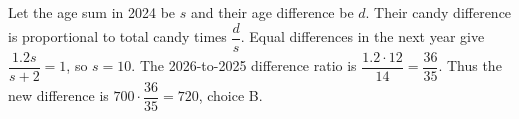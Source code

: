 Let the age sum in 2024 be $s$ and their age difference be $d$. Their candy difference is proportional to total candy times $\dfrac{d}{s}$. Equal differences in the next year give $\dfrac{1.2s}{s+2}=1$, so $s=10$. The 2026-to-2025 difference ratio is $\dfrac{1.2\cdot12}{14}=\dfrac{36}{35}$. Thus the new difference is $700\cdot\dfrac{36}{35}=\boxed{720}$, choice B.
